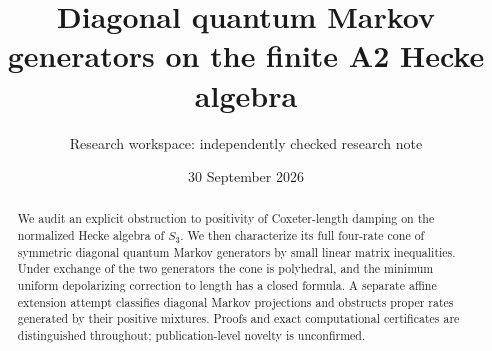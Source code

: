\documentclass[11pt]{article}
\title{Diagonal quantum Markov generators on the finite A2 Hecke algebra}
\author{Research workspace: independently checked research note}
\date{30 September 2026}
\theoremstyle{remark}\newtheorem{remark}[definition]{Remark}
\begin{document}
\maketitle
\begin{abstract}
We audit an explicit obstruction to positivity of Coxeter-length damping
on the normalized Hecke algebra of $S_3$. We then characterize its full
four-rate cone of symmetric diagonal quantum Markov generators by small
linear matrix inequalities. Under exchange of the two generators the cone
is polyhedral, and the minimum uniform depolarizing correction to length
has a closed formula. A separate affine extension attempt classifies
diagonal Markov projections and obstructs proper rates generated by their
positive mixtures. Proofs and exact computational certificates are
distinguished throughout; publication-level novelty is unconfirmed.
\end{abstract}



\end{document}
